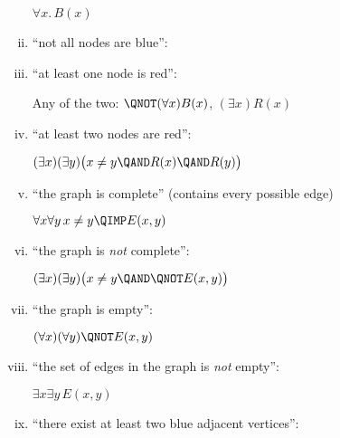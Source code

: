 \begin{problem}
\begin{enumerate}[(i)]
\begin{solution}
$\forall x.\, B(x)$\hrulefill
\end{solution}

\item ``not all nodes are blue'': 

\item ``at least one node is red'': 

\begin{solution}
Any of the two: $\QNOT(\forall x)B(x)$, $(\exists x)R(x)$
\end{solution}

\item ``at least two nodes are red'': 

\begin{solution}
$(\exists x)(\exists y)\bigl( x\neq y \QAND R(x) \QAND R(y) \bigr)$
\end{solution}

\examspace[0.75in]

\item ``the graph is complete'' (contains every possible edge)

\begin{solution}
$\forall x\forall y\, x\neq y \QIMP E(x,y)$
\end{solution}

\examspace[0.75in]

\item ``the graph is \emph{not} complete'': 

\begin{solution}
$(\exists x)(\exists y)\bigl( x\neq y \QAND \QNOT E(x,y) \bigr)$
\end{solution}\hrulefill

\item ``the graph is empty'': 

\begin{solution}
$(\forall x)(\forall y) \QNOT E(x,y)$
\end{solution}

\item \label{item-fourth}
``the set of edges in the graph is \emph{not} empty'': 

\begin{solution}
$\exists x\exists y\, E(x,y)$
\end{solution}

\examspace[0.75in]

\item ``there exist at least two blue adjacent vertices'':


\end{enumerate}
\end{problem}
